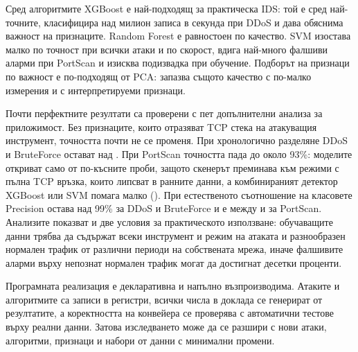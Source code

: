Сред алгоритмите XGBoost е най-подходящ за практическа IDS: той е сред най-точните, класифицира над милион записа в секунда при DDoS и дава обяснима важност на признаците. Random Forest е равностоен по качество. SVM изостава малко по точност при всички атаки и по скорост, вдига най-много фалшиви аларми при PortScan и изисква подизвадка при обучение. Подборът на признаци по важност е по-подходящ от PCA: запазва същото качество с по-малко измерения и с интерпретируеми признаци.

Почти перфектните резултати са проверени с пет допълнителни анализа за приложимост. Без признаците, които отразяват TCP стека на атакуващия инструмент, точността почти не се променя. При хронологично разделяне DDoS и BruteForce остават над . При PortScan точността пада до около 93\%: моделите откриват само  от по-късните проби, защото скенерът преминава към режими с пълна TCP връзка, които липсват в ранните данни, а комбинираният детектор XGBoost или SVM помага малко (). При естественото съотношение на класовете Precision остава над 99\% за DDoS и BruteForce и е между  и  за PortScan. Анализите показват и две условия за практическото използване: обучаващите данни трябва да съдържат всеки инструмент и режим на атаката и разнообразен нормален трафик от различни периоди на собствената мрежа, иначе фалшивите аларми върху непознат нормален трафик могат да достигнат десетки проценти.

Програмната реализация е декларативна и напълно възпроизводима. Атаките и алгоритмите са записи в регистри, всички числа в доклада се генерират от резултатите, а коректността на конвейера се проверява с автоматични тестове върху реални данни. Затова изследването може да се разшири с нови атаки, алгоритми, признаци и набори от данни с минимални промени.
